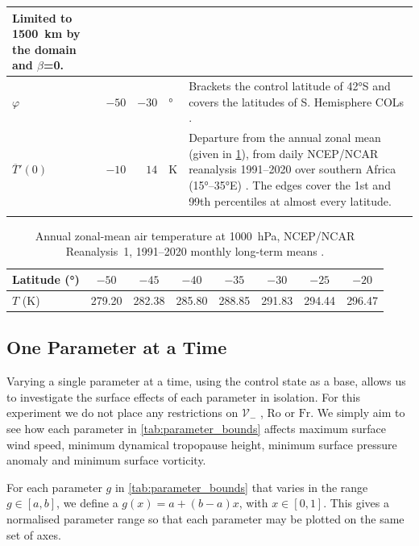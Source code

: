 \documentclass{article}
\begin{document}
\begin{xltabular}{\textwidth}{@{}
    >{\raggedright\arraybackslash}l
    r
    r
    >{\raggedright\arraybackslash}l
    >{\raggedright\arraybackslash}X
  @{}}
    Limited to \qty{1500}{\kilo\meter} by the domain and $\beta$=0. \\
  \midrule
  $\varphi$ & $-50$ & $-30$ & \unit{\degree} &
    Brackets the control latitude of \ang{42}S \cite{Barnes2022main} and covers the latitudes of S. Hemisphere COLs \cite{Barnes2021col}.\\
    $\overline{T}'(0)$ & $-10$ & $14$ & \unit{\kelvin} &
    Departure from the annual zonal mean (given in \cref{tab:T_bottom_mean}), from daily NCEP/NCAR reanalysis 1991--2020 over southern Africa (\ang{15}--\ang{35}E) \cite{Kalnay1996}.
    The edges cover the 1st and 99th percentiles at almost every latitude.\\
  \rowsep
\end{xltabular}
\endgroup

\begin{table}[htbp]
  \centering
  \caption{Annual zonal-mean air temperature at \qty{1000}{\hecto\pascal},
    NCEP/NCAR Reanalysis~1, 1991--2020 monthly long-term means \cite{Kalnay1996}.}
  \label{tab:T_bottom_mean}
  \begin{tabular}{l*{7}{c}}
    \toprule
    Latitude (\unit{\degree}) & $-50$ & $-45$ & $-40$ & $-35$ & $-30$ & $-25$ & $-20$ \\
    \midrule
    $T$ (\unit{\kelvin})      & 279.20 & 282.38 & 285.80 & 288.85 & 291.83 & 294.44 & 296.47 \\
    \bottomrule
  \end{tabular}
\end{table}

\subsection{One Parameter at a Time}\label{sec:one_param}

Varying a single parameter at a time, using the control state as a base, allows us to investigate the surface effects of each parameter in isolation.
For this experiment we do not place any restrictions on $\mathcal{V}_-$ , $\mathrm{Ro}$ or $\mathrm{Fr}$.
We simply aim to see how each parameter in \cref{tab:parameter_bounds} affects maximum surface wind speed, minimum dynamical tropopause height, minimum surface pressure anomaly and minimum surface vorticity.

For each parameter $g$ in \cref{tab:parameter_bounds} that varies in the range $g\in[a,b]$, we define a $g(x)=a + (b-a)x$, with $x\in[0,1]$.
This gives a normalised parameter range so that each parameter may be plotted on the same set of axes.
\end{document}
